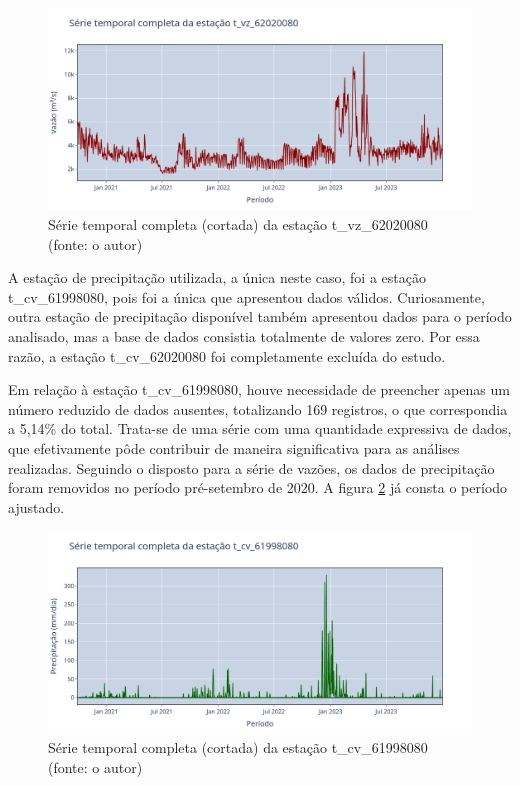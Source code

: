 \begin{figure}[!h]
	\centering
	\includegraphics[scale=0.25]{Figuras/rio_grande/serie_completa_estacao_t_vz_62020080.png}
	\caption{Série temporal completa (cortada) da estação t\_vz\_62020080\\(fonte: o autor)}
	\label{fig:serie_completa_estacao_t_vz_62020080}
\end{figure}

A estação de precipitação utilizada, a única neste caso, foi a estação t\_cv\_61998080, pois foi a única que apresentou dados válidos. Curiosamente, outra estação de precipitação disponível também apresentou dados para o período analisado, mas a base de dados consistia totalmente de valores zero. Por essa razão, a estação t\_cv\_62020080 foi completamente excluída do estudo.

Em relação à estação t\_cv\_61998080, houve necessidade de preencher apenas um número reduzido de dados ausentes, totalizando 169 registros, o que correspondia a 5,14\% do total. Trata-se de uma série com uma quantidade expressiva de dados, que efetivamente pôde contribuir de maneira significativa para as análises realizadas. Seguindo o disposto para a série de vazões, os dados de precipitação foram removidos no período pré-setembro de 2020. A figura \ref{fig:serie_completa_estacao_t_cv_61998080} já consta o período ajustado.

\begin{figure}[!h]
	\centering
	\includegraphics[scale=0.25]{Figuras/rio_grande/serie_completa_estacao_t_cv_61998080.png}
	\caption{Série temporal completa (cortada) da estação t\_cv\_61998080\\(fonte: o autor)}
	\label{fig:serie_completa_estacao_t_cv_61998080}
\end{figure}
\clearpage


